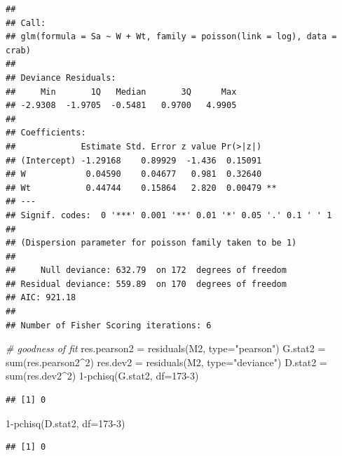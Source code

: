 \documentclass[
]{article}
\newenvironment{Shaded}{\begin{snugshade}}{\end{snugshade}}
\newcommand{\AttributeTok}[1]{\textcolor[rgb]{0.77,0.63,0.00}{#1}}
\newcommand{\CommentTok}[1]{\textcolor[rgb]{0.56,0.35,0.01}{\textit{#1}}}
\newcommand{\DecValTok}[1]{\textcolor[rgb]{0.00,0.00,0.81}{#1}}
\newcommand{\FunctionTok}[1]{\textcolor[rgb]{0.00,0.00,0.00}{#1}}
\newcommand{\NormalTok}[1]{#1}
\newcommand{\OtherTok}[1]{\textcolor[rgb]{0.56,0.35,0.01}{#1}}
\newcommand{\SpecialCharTok}[1]{\textcolor[rgb]{0.00,0.00,0.00}{#1}}
\newcommand{\StringTok}[1]{\textcolor[rgb]{0.31,0.60,0.02}{#1}}
\begin{document}
\begin{verbatim}
## 
## Call:
## glm(formula = Sa ~ W + Wt, family = poisson(link = log), data = crab)
## 
## Deviance Residuals: 
##     Min       1Q   Median       3Q      Max  
## -2.9308  -1.9705  -0.5481   0.9700   4.9905  
## 
## Coefficients:
##             Estimate Std. Error z value Pr(>|z|)   
## (Intercept) -1.29168    0.89929  -1.436  0.15091   
## W            0.04590    0.04677   0.981  0.32640   
## Wt           0.44744    0.15864   2.820  0.00479 **
## ---
## Signif. codes:  0 '***' 0.001 '**' 0.01 '*' 0.05 '.' 0.1 ' ' 1
## 
## (Dispersion parameter for poisson family taken to be 1)
## 
##     Null deviance: 632.79  on 172  degrees of freedom
## Residual deviance: 559.89  on 170  degrees of freedom
## AIC: 921.18
## 
## Number of Fisher Scoring iterations: 6
\end{verbatim}

\begin{Shaded}
\begin{Highlighting}[]
\CommentTok{\# goodness of fit}
\NormalTok{res.pearson2 }\OtherTok{=} \FunctionTok{residuals}\NormalTok{(M2, }\AttributeTok{type=}\StringTok{"pearson"}\NormalTok{)}
\NormalTok{G.stat2 }\OtherTok{=} \FunctionTok{sum}\NormalTok{(res.pearson2}\SpecialCharTok{\^{}}\DecValTok{2}\NormalTok{)}
\NormalTok{res.dev2 }\OtherTok{=} \FunctionTok{residuals}\NormalTok{(M2, }\AttributeTok{type=}\StringTok{"deviance"}\NormalTok{)}
\NormalTok{D.stat2 }\OtherTok{=} \FunctionTok{sum}\NormalTok{(res.dev2}\SpecialCharTok{\^{}}\DecValTok{2}\NormalTok{)}
\DecValTok{1}\SpecialCharTok{{-}}\FunctionTok{pchisq}\NormalTok{(G.stat2, }\AttributeTok{df=}\DecValTok{173{-}3}\NormalTok{)}
\end{Highlighting}
\end{Shaded}

\begin{verbatim}
## [1] 0
\end{verbatim}

\begin{Shaded}
\begin{Highlighting}[]
\DecValTok{1}\SpecialCharTok{{-}}\FunctionTok{pchisq}\NormalTok{(D.stat2, }\AttributeTok{df=}\DecValTok{173{-}3}\NormalTok{)}
\end{Highlighting}
\end{Shaded}

\begin{verbatim}
## [1] 0
\end{verbatim}

\begin{Shaded}
\end{Shaded}
\end{document}
